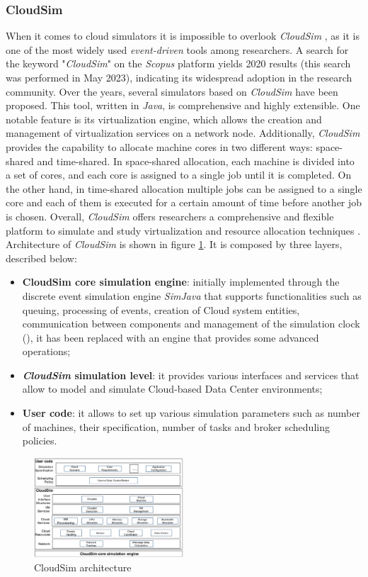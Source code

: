 {\subsubsection{CloudSim}
When it comes to cloud simulators it is impossible to overlook \emph{CloudSim} \cite{calheiros2011cloudsim}, as it is one of the most widely used \emph{event-driven} tools among researchers. A search for the keyword "\emph{CloudSim}" on the \emph{Scopus} platform yields 2020 results (this search was performed in May 2023), indicating its widespread adoption in the research community. Over the years, several simulators based on \emph{CloudSim} have been proposed. This tool, written in \emph{Java}, is comprehensive and highly extensible.
One notable feature is its virtualization engine, which allows the creation and management of virtualization services on a network node. Additionally, \emph{CloudSim} provides the capability to allocate machine cores in two different ways: space-shared and time-shared.
In space-shared allocation, each machine is divided into a set of cores, and each core is assigned to a single job until it is completed. On the other hand, in time-shared allocation multiple jobs can be assigned to a single core and each of them is executed for a certain amount of time before another job is chosen.
Overall, \emph{CloudSim} offers researchers a comprehensive and flexible platform to simulate and study virtualization and resource allocation techniques \cite{mansouri2020cloud}.
Architecture of \emph{CloudSim} is shown in figure \ref{fig:cloudsim_arch}. It is composed by three layers, described below:
\begin{itemize}
    \item \textbf{CloudSim core simulation engine}: initially implemented through the discrete event simulation engine \emph{SimJava} that supports functionalities such as queuing, processing of events, creation of Cloud system entities, communication between components and management of the simulation clock (\cite{calheiros2011cloudsim}), it has been replaced with an engine that provides some advanced operations;
    \item \textbf{\emph{CloudSim} simulation level}: it provides various interfaces and services that allow to model and simulate Cloud-based Data Center environments; 
    \item \textbf{User code}: it allows to set up various simulation parameters such as number of machines, their specification, number of tasks and broker scheduling policies.
\end{itemize}
\begin{figure}[h]
    \centering
    \includegraphics[width=0.5\textwidth]{chapters/images/cloudsim_arch.jpeg}
    \caption{CloudSim architecture}
    \label{fig:cloudsim_arch}
\end{figure}
}
